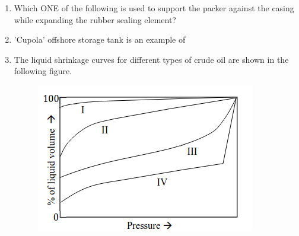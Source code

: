 \documentclass[journal,12pt,onecolumn]{IEEEtran}
\theoremstyle{remark}
\begin{document}
\begin{enumerate}
\begin{enumerate}
\end{enumerate}

\item Which ONE of the following is used to support the packer against the casing while expanding the rubber sealing element?

\hfill{}

\begin{enumerate}
\end{enumerate}

\item 'Cupola' offshore storage tank is an example of

\hfill{}

\begin{enumerate}
\end{enumerate}

\pagebreak

\item The liquid shrinkage curves for different types of crude oil are shown in the following figure.

\begin{figure}[h!]
  \centering
  \includegraphics[width=0.4\columnwidth]{figs/fig6.png} 
   \caption*{}
  \label{fig:Q19}
\end{figure}


\end{enumerate}
\end{document}
